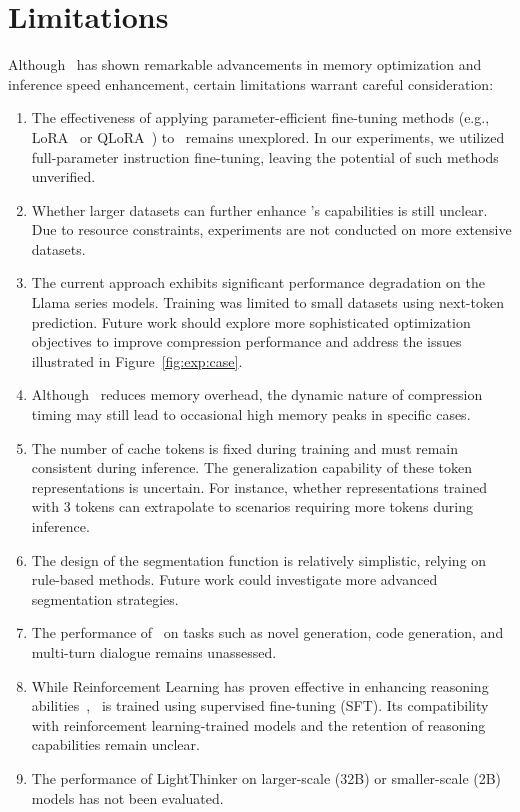 \section*{Limitations}
Although \ours~has shown remarkable advancements in memory optimization and inference speed enhancement, certain limitations warrant careful consideration:
\begin{enumerate}
    \item The effectiveness of applying parameter-efficient fine-tuning methods (e.g., LoRA~\citep{iclr22_lora} or QLoRA~\citep{nips23_qlora}) to \ours~remains unexplored. 
    In our experiments, we utilized full-parameter instruction fine-tuning, leaving the potential of such methods unverified.

    \item Whether larger datasets can further enhance \ours's capabilities is still unclear. 
    Due to resource constraints, experiments are not conducted on more extensive datasets.

    \item The current approach exhibits significant performance degradation on the Llama series models. 
    Training was limited to small datasets using next-token prediction. 
    Future work should explore more sophisticated optimization objectives to improve compression performance and address the issues illustrated in Figure~\ref{fig:exp:case}.

    \item Although \ours~reduces memory overhead, the dynamic nature of compression timing may still lead to occasional high memory peaks in specific cases.

    \item The number of cache tokens is fixed during training and must remain consistent during inference. 
    The generalization capability of these token representations is uncertain. 
    For instance, whether representations trained with 3 tokens can extrapolate to scenarios requiring more tokens during inference.

    \item The design of the segmentation function is relatively simplistic, relying on rule-based methods. 
    Future work could investigate more advanced segmentation strategies.

    \item The performance of \ours~on tasks such as novel generation, code generation, and multi-turn dialogue remains unassessed.

    \item While Reinforcement Learning has proven effective in enhancing reasoning abilities~\citep{arxiv25_deepseek_r1}, \ours~is trained using supervised fine-tuning (SFT). 
    Its compatibility with reinforcement learning-trained models and the retention of reasoning capabilities remain unclear.

    \item The performance of LightThinker on larger-scale (32B) or smaller-scale (2B) models has not been evaluated.
\end{enumerate}